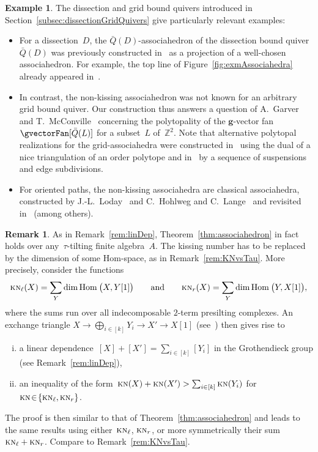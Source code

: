 \documentclass{memo-l}
\theoremstyle{definition}
\newtheorem{example}[theorem]{Example}
\newtheorem{remark}[theorem]{Remark}
\newcommand{\Z}{\mathbb{Z}} %
\renewcommand{\b}[1]{\mathbf{#1}} %
\newcommand{\fref}[1]{Figure~\ref{#1}} %
\newcommand{\KN}{\textsc{kn}} %
\newcommand{\Hom}[1]{\operatorname{{\rm Hom}}_{#1}}
\begin{document}
\begin{example}
The dissection and grid bound quivers introduced in Section~\ref{subsec:dissectionGridQuivers} give particularly relevant examples:
\begin{itemize}
\item For a dissection~$D$, the $\bar Q(D)$-associahedron of the dissection bound quiver $\bar Q(D)$ was previously constructed in~\cite{MannevillePilaud-accordion} as a projection of a well-chosen associahedron.
For example, the top line of \fref{fig:exmAssociahedra} already appeared in~\cite{MannevillePilaud-accordion}.
\item In contrast, the non-kissing associahedron was not known for an arbitrary grid bound quiver. Our construction thus answers a question of A.~Garver and T.~McConville~\cite{GarverMcConville-grid} concerning the polytopality of the $\b{g}$-vector fan~$\gvectorFan[\bar Q(L)]$ for a subset~$L$ of~$\Z^2$. Note that alternative polytopal realizations for the grid-associahedra were constructed in~\cite{SantosStumpWelker} using the dual of a nice triangulation of an order polytope and in~\cite[Sect.~4]{McConville} by a sequence of suspensions and edge subdivisions.
\item For oriented paths, the non-kissing associahedra are classical associahedra, constructed by J.-L.~Loday~\cite{Loday} and C.~Hohlweg and C.~Lange~\cite{HohlwegLange} and revisited in~\cite{HohlwegLangeThomas, Stella, PilaudSantos-brickPolytope, LangePilaud, HohlwegPilaudStella} (among others).
\end{itemize}
\end{example}

\begin{remark}
\label{rem:polytope}
As in Remark~\ref{rem:linDep}, Theorem~\ref{thm:associahedron} in fact holds over any~$\tau$-tilting finite algebra~$A$.
The kissing number has to be replaced by the dimension of some Hom-space, as in Remark~\ref{rem:KNvsTau}.
More precisely, consider the functions
\[
\KN_\ell(X) = \sum_Y \dim \Hom{} \big( X, Y[1] \big)
\qquad\text{and}\qquad
\KN_r(X) = \sum_Y \dim \Hom{} \big( Y, X[1] \big),
\]
where the sums run over all indecomposable $2$-term presilting complexes.
An exchange triangle $X \rightarrow \bigoplus_{i \in [k]} Y_i \rightarrow X' \rightarrow X[1]$ (see~\cite{AiharaIyama}) then gives rise to
\begin{enumerate}[(i)]
\item a linear dependence~$[X] + [X'] = \sum_{i \in [k]} [Y_i]$ in the Grothendieck group (see Remark~\ref{rem:linDep}),
\item an inequality of the form~$\KN(X) + \KN(X') > \sum_{i \in [k]} \KN(Y_i)$ for~${\KN \! \in \! \{\KN_\ell, \KN_r\}}$.
\end{enumerate}
The proof is then similar to that of Theorem~\ref{thm:associahedron} and leads to the same results using either~$\KN_\ell$, $\KN_r$, or more symmetrically their sum~$\KN_\ell + \KN_r$.
Compare to Remark~\ref{rem:KNvsTau}.
\end{remark}
\end{document}
